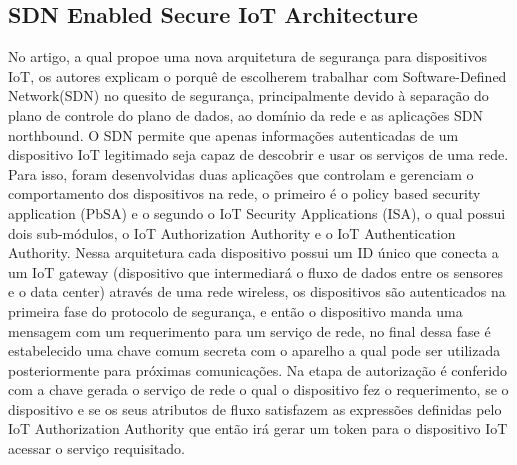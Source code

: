 \documentclass[article]{abntex2}
\begin{document}
\subsection{SDN Enabled Secure IoT Architecture}%
No artigo, a qual propoe uma nova arquitetura de segurança para dispositivos IoT, os autores explicam o porquê de escolherem trabalhar com Software-Defined Network(SDN) no quesito de segurança, principalmente devido à separação do plano de controle do plano de dados, ao domínio da rede e as aplicações SDN northbound. O SDN permite que apenas informações autenticadas de um dispositivo IoT legitimado seja capaz de descobrir e usar os serviços de uma rede. Para isso, foram desenvolvidas duas aplicações que controlam e gerenciam o comportamento dos dispositivos na rede, o primeiro é o policy based security application (PbSA) e o segundo o IoT Security Applications (ISA), o qual possui dois sub-módulos, o IoT Authorization Authority e o IoT Authentication Authority. Nessa arquitetura cada dispositivo possui um ID único que conecta a um IoT gateway (dispositivo que intermediará o fluxo de dados entre os sensores e o data center) através de uma rede wireless, os dispositivos são autenticados na primeira fase do protocolo de segurança, e então o dispositivo manda uma mensagem com um requerimento para um serviço de rede, no final dessa fase é estabelecido uma chave comum secreta com o aparelho a qual pode ser utilizada posteriormente para próximas comunicações. Na etapa de autorização é conferido com a chave gerada  o serviço de rede o qual o dispositivo fez o requerimento, se o dispositivo e se os seus atributos de fluxo satisfazem as expressões definidas pelo IoT Authorization Authority que então irá gerar um token para o dispositivo IoT acessar o serviço requisitado.

    



\nocite{Auer:2019}
\nocite{Tiburski:2019}
\nocite{Li:2019}
\nocite{Karmakar:2019}
\nocite{Oliveira:2018}
\nocite{Das:2018}
\nocite{Alphand:2018}
\nocite{Novo:2018}
\nocite{Stergiou:2017}
\nocite{Minoli:2017}
\end{document}
